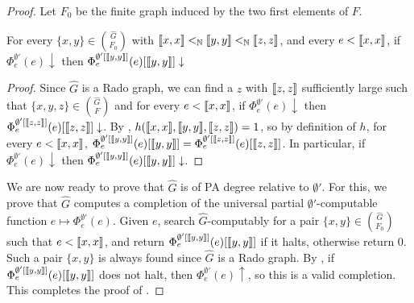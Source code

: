 \begin{proof}
Let $F_0$ be the finite graph induced by the two first elements of $F$.

\begin{claim}\label{claim:weak-rado-triples-aca-2}
For every $\{x, y\} \in {\hat{G} \choose F_0}$ with $\llbracket x , x \rrbracket <_{\mathbb{N}} \llbracket y , y \rrbracket <_{\mathbb{N}} \llbracket z , z \rrbracket$, and every $e < \llbracket x , x \rrbracket$, if $\Phi_e^{\emptyset'}(e)\downarrow$ then $\Phi_e^{\emptyset'[\llbracket y , y \rrbracket]}(e)[\llbracket y , y \rrbracket]\downarrow$
\end{claim}
\begin{proof}
Since $\hat{G}$ is a Rado graph, we can find a $z$ with $\llbracket z , z \rrbracket$ sufficiently large such that $\{x, y, z\} \in {\hat{G} \choose F}$ and for every $e < \llbracket x , x \rrbracket$, if $\Phi_e^{\emptyset'}(e)\downarrow$ then $\Phi_e^{\emptyset'[\llbracket z , z \rrbracket]}(e)[\llbracket z , z \rrbracket]\downarrow$.
By , $h(\llbracket x , x \rrbracket, \llbracket y , y \rrbracket, \llbracket z , z \rrbracket) = 1$, so by definition of $h$, for every $e < \llbracket x , x \rrbracket$, $\Phi_e^{\emptyset'[\llbracket y , y \rrbracket]}(e)[\llbracket y , y \rrbracket] = \Phi_e^{\emptyset'[\llbracket z , z \rrbracket]}(e)[\llbracket z , z \rrbracket]$. In particular, if $\Phi_e^{\emptyset'}(e)\downarrow$ then $\Phi_e^{\emptyset'[\llbracket y , y \rrbracket]}(e)[\llbracket y , y \rrbracket]\downarrow$.
\end{proof}

We are now ready to prove that $\hat{G}$ is of PA degree relative to $\emptyset'$.
For this, we prove that $\hat{G}$ computes a completion of the universal partial $\emptyset'$-computable function $e \mapsto \Phi^{\emptyset'}_e(e)$. 
Given $e$, search $\hat{G}$-computably for a pair $\{x, y\} \in {\hat{G} \choose F_0}$ such that $e < \llbracket x , x \rrbracket$, and return $\Phi_e^{\emptyset'[\llbracket y , y \rrbracket]}(e)[\llbracket y , y \rrbracket]$ if it halts, otherwise return 0.
Such a pair $\{x, y\}$ is always found since $\hat{G}$ is a Rado graph. By , if $\Phi_e^{\emptyset'[\llbracket y , y \rrbracket]}(e)[\llbracket y , y \rrbracket]$ does not halt, then $\Phi_e^{\emptyset'}(e)\uparrow$, so this is a valid completion.
This completes the proof of .
\end{proof}


